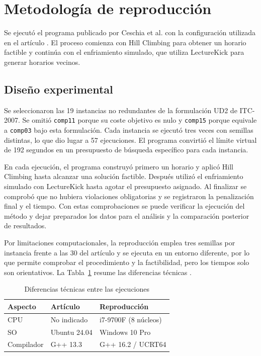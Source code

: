 \section{Metodología de reproducción}
\label{sec:reproduccion}

Se ejecutó el programa publicado por Ceschia et al. con la configuración utilizada en el artículo \cite{ceschia2026revisiting}. El proceso comienza con Hill Climbing para obtener un horario factible y continúa con el enfriamiento simulado, que utiliza LectureKick para generar horarios vecinos.

\subsection{Diseño experimental}

Se seleccionaron las 19 instancias no redundantes de la formulación UD2 de ITC-2007. Se omitió \texttt{comp11} porque su coste objetivo es nulo y \texttt{comp15} porque equivale a \texttt{comp03} bajo esta formulación. Cada instancia se ejecutó tres veces con semillas distintas, lo que dio lugar a 57 ejecuciones. El programa convirtió el límite virtual de 192 segundos en un presupuesto de búsqueda específico para cada instancia.

En cada ejecución, el programa construyó primero un horario y aplicó Hill Climbing hasta alcanzar una solución factible. Después utilizó el enfriamiento simulado con LectureKick hasta agotar el presupuesto asignado. Al finalizar se comprobó que no hubiera violaciones obligatorias y se registraron la penalización final y el tiempo. Con estas comprobaciones se puede verificar la ejecución del método y dejar preparados los datos para el análisis y la comparación posterior de resultados.

Por limitaciones computacionales, la reproducción emplea tres semillas por instancia frente a las 30 del artículo y se ejecuta en un entorno diferente, por lo que permite comprobar el procedimiento y la factibilidad, pero los tiempos solo son orientativos. La Tabla~\ref{tab:entorno} resume las diferencias técnicas \cite{boulesteix2019benchmarking}.

\begin{table}[H]
\caption{Diferencias técnicas entre las ejecuciones}
\label{tab:entorno}
\centering
\scriptsize
\begin{tabular}{@{}lll@{}}
\toprule
Aspecto & Artículo & Reproducción \\
\midrule
CPU & No indicado & i7-9700F (8 núcleos) \\
SO & Ubuntu 24.04 & Windows 10 Pro \\
Compilador & G++ 13.3 & G++ 16.2 / UCRT64 \\
\bottomrule
\end{tabular}
\end{table}

